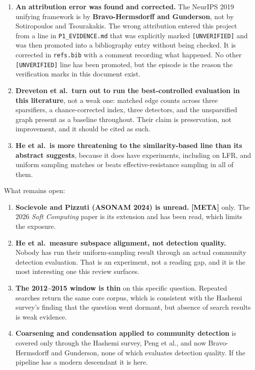\documentclass[10pt,a4paper]{article}
\begin{document}
\begin{enumerate}
\item \textbf{An attribution error was found and corrected.} The NeurIPS 2019 unifying framework
is by \textbf{Bravo-Hermsdorff and Gunderson}, not by Sotiropoulos and Tsourakakis. The wrong
attribution entered this project from a line in \texttt{P1\_EVIDENCE.md} that was explicitly
marked \texttt{[UNVERIFIED]} and was then promoted into a bibliography entry without being
checked. It is corrected in \texttt{refs.bib} with a comment recording what happened. No other
\texttt{[UNVERIFIED]} line has been promoted, but the episode is the reason the verification
marks in this document exist.
\item \textbf{Dreveton et al.\ turn out to run the best-controlled evaluation in this
literature}, not a weak one: matched edge counts across three sparsifiers, a chance-corrected
index, three detectors, and the unsparsified graph present as a baseline throughout. Their claim
is preservation, not improvement, and it should be cited as such.
\item \textbf{He et al.\ is more threatening to the similarity-based line than its abstract
suggests}, because it does have experiments, including on LFR, and uniform sampling matches or
beats effective-resistance sampling in all of them.
\end{enumerate}

What remains open:

\begin{enumerate}
\item \textbf{Socievole and Pizzuti (ASONAM 2024) is unread.} \textbf{[META]} only. The 2026
\emph{Soft Computing} paper is its extension and has been read, which limits the exposure.
\item \textbf{He et al.\ measure subspace alignment, not detection quality.} Nobody has run their
uniform-sampling result through an actual community detection evaluation. That is an experiment,
not a reading gap, and it is the most interesting one this review surfaces.
\item \textbf{The 2012--2015 window is thin} on this specific question. Repeated searches return
the same core corpus, which is consistent with the Hashemi survey's finding that the question
went dormant, but absence of search results is weak evidence.
\item \textbf{Coarsening and condensation applied to community detection} is covered only through
the Hashemi survey, Peng et al., and now Bravo-Hermsdorff and Gunderson, none of which evaluates
detection quality. If the pipeline has a modern descendant it is here.
\end{enumerate}
\end{document}
